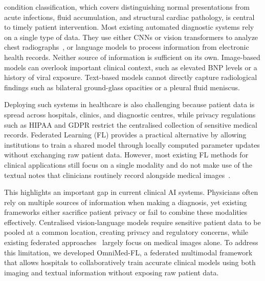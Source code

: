 \documentclass[letterpaper, conference]{IEEEtran}
\begin{document}
 condition classification, which covers
distinguishing normal presentations from acute infections, fluid
accumulation, and structural cardiac pathology, is central to timely patient intervention. Most existing automated diagnostic systems rely on a single type of data. They use either CNNs or vision transformers to analyze chest radiographs~\cite{Rajpurkar2017,Irvin2019}, or language models to process information from electronic health records.
Neither source of information is sufficient on its own. Image-based models can overlook important clinical context, such as elevated BNP levels or a history of viral exposure. Text-based models cannot directly capture radiological findings such as bilateral ground-glass opacities or a pleural fluid meniscus.

Deploying such systems in healthcare is also challenging because patient data is spread across hospitals, clinics, and diagnostic centres, while privacy regulations such as HIPAA and GDPR restrict the centralised collection of sensitive medical records. Federated Learning (FL) provides a practical alternative by allowing institutions to train a shared model through locally computed parameter updates without exchanging raw patient data. However, most existing FL methods for clinical applications still focus on a single modality and do not make use of the textual notes that clinicians routinely record alongside medical images~\cite{Sheller2020,Dou2021,Kaissis2021}.

This highlights an important gap in current clinical AI systems. Physicians often rely on multiple sources of information when making a diagnosis, yet existing frameworks either sacrifice patient privacy or fail to combine these modalities effectively. Centralised vision-language models require sensitive patient data to be pooled at a common location, creating privacy and regulatory concerns, while existing federated approaches~\cite{Sheller2020,Kaissis2021} largely focus on medical images alone. To address this limitation, we developed OmniMed-FL, a federated multimodal framework that allows hospitals to collaboratively train accurate clinical models using both imaging and textual information without exposing raw patient data.
\end{document}
